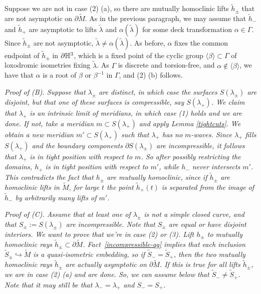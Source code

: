 \documentclass[12pt]{amsart}
\theoremstyle{definition}
\theoremstyle{remark}
\begin{document}
Suppose we are not in case (2) (a), so there are mutually homoclinic lifts $\tilde h_\pm$ that are not asymptotic on $\partial \tilde M$. As in the previous paragraph, we may assume that $\tilde h_-$ and $\tilde h_+$ are asymptotic to lifts $\tilde \lambda$ and $\alpha(\tilde \lambda)$ for some deck transformation $\alpha \in \Gamma$. Since $\tilde h_\pm$ are not asymptotic, $\tilde \lambda \neq \alpha(\tilde \lambda)$. As before, $\alpha $ fixes the common endpoint of $\tilde h_\pm$ in $\partial \mathbb H^3$, which is a fixed point of the cyclic group $\langle \beta \rangle \subset \Gamma$ of loxodromic isometries fixing $\tilde \lambda$. As $\Gamma$ is discrete and torsion-free, and $\alpha \not \in \langle \beta \rangle $, we have that $\alpha$ is a root of $\beta$ or $\beta^{-1}$ in $\Gamma$, and (2) (b) follows.

\medskip

\noindent \it Proof of (B). \rm  Suppose that $\lambda_\pm$ are distinct, in which case the surfaces $S(\lambda_\pm)$ are disjoint, but that one of these surfaces is compressible, say $ S (\lambda_+) $. We claim that $\lambda_+$ is an intrinsic limit of meridians, in which case (1) holds and we are done. If not, take a meridian $m \subset S(\lambda_+) $ and apply  Lemma \ref {tightcuts}. We obtain a new meridian  $m' \subset S(\lambda_+) $  such that $\lambda_+$ has no $m$-waves. Since $\lambda_+$ fills $S(\lambda_+)$ and the boundary components $\partial S(\lambda_\pm)$  are incompressible, it follows that $\lambda_+$ is in tight position with respect to $m$. So after possibly restricting the domains, $h_+$  is in tight position with respect to $m'$, while $h_-$  never intersects $m'$.  This  contradicts the fact that $h_\pm$  are mutually homoclinic, since if $\tilde h_\pm$ are homoclinic lifts in $\tilde M$, for large $t$ the point $\tilde h_+(t)$ is  separated from  the image of $\tilde h_-$ by  arbitrarily many lifts of $m'$. 

\medskip


\noindent \it Proof of (C). \rm  Assume that at least one of $\lambda_\pm$ is not a simple closed curve, and that $S_\pm := S(\lambda_\pm)$ are incompressible.  Note that $S_\pm$ are equal or have disjoint interiors. We want to prove that we're in case (2) or (3).  Lift $h_\pm$ to mutually homoclinic rays $\tilde h_\pm \subset \partial \tilde M$. Fact~\ref{incompressible-qg} implies that each inclusion $\tilde S_\pm \hookrightarrow \tilde M$ is a quasi-isometric embedding, so if $\tilde S_- = \tilde S_+$, then the two mutually homoclinic rays $\tilde h_\pm$ are actually asymptotic on $\partial \tilde M$. If this is true for all lifts $\tilde h_\pm$, we are in case (2) (a) and are done. So, we can assume below that $\tilde S_- \neq \tilde S_+$. Note that it may still be that $\lambda_-=\lambda_+$ and $S_-=S_+$.
\end{document}
